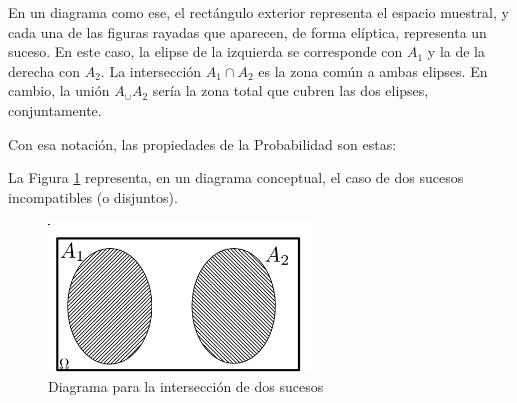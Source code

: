 \begin{itemize}
En un diagrama como ese, el rectángulo exterior representa el espacio muestral, y cada una de las figuras rayadas que aparecen, de forma elíptica,  representa un suceso. En este caso, la elipse de la izquierda se corresponde con $A_1$ y la de la derecha con $A_2$. La intersección $A_1\cap A_2$ es la zona común a ambas elipses. En cambio, la unión $A_\cup A_2$ sería la zona total que cubren las dos elipses, conjuntamente.

\pagebreak
\hspace{-0.8cm}Con esa notación, las propiedades de la Probabilidad son estas:

\begin{center}
\end{center}
    \end{itemize}
La Figura \ref{Cap03:fig:DiagramaVennSucesosDisjuntos} representa, en un diagrama conceptual, el caso de dos sucesos incompatibles (o disjuntos).

\begin{figure}[htbp]
\begin{center}
\includegraphics[height=4cm]{../fig/Cap03-DiagramaVennSucesosDisjuntos.png}
	\caption{Diagrama para la intersección de dos sucesos }\label{Cap03:fig:DiagramaVennSucesosDisjuntos}
\end{center}
\end{figure}

